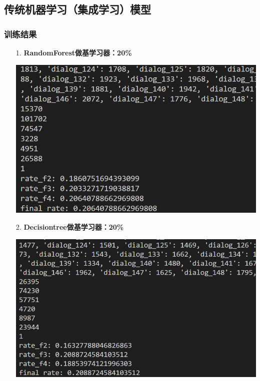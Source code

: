 \documentclass[11pt]{article}
\begin{document}
        \subsection{传统机器学习（集成学习）模型}
            \subsubsection{训练结果}
            \begin{enumerate}
                \item [1. ]\textbf{RandomForest做基学习器：20\%}
                \begin{center}
                    \includegraphics[scale=1]{graph/result1.png}
                \end{center}
                \item [2. ]\textbf{Decisiontree做基学习器：20\%}
                \begin{center}
                    \includegraphics[scale=1]{graph/result2.png}
                \end{center}

\end{enumerate}
\end{document}
